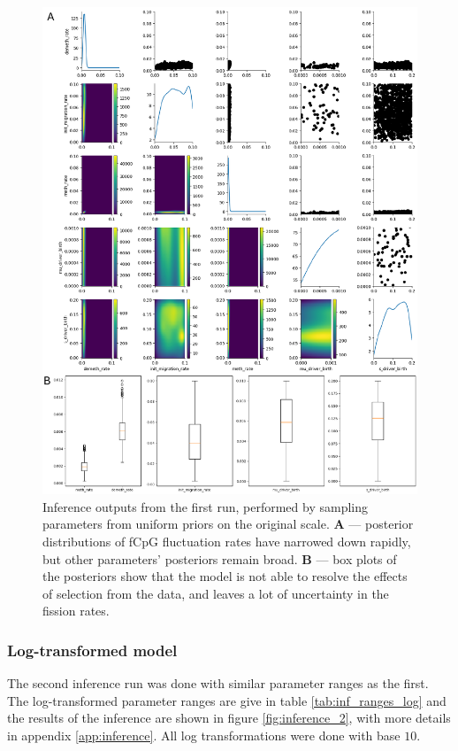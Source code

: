 \begin{figure}[h]
    \centering
    \includegraphics[width=\textwidth]{Chapter_5/figures/inference_raw/inference_1.pdf}
    \caption{Inference outputs from the first run, performed by sampling
    parameters from uniform priors on the original scale. \textbf{A} ---
    posterior distributions of fCpG fluctuation rates have narrowed down
    rapidly, but other parameters' posteriors remain broad. \textbf{B} --- box
    plots of the posteriors show that the model is not able to resolve the
    effects of selection from the data, and leaves a lot of uncertainty in the
    fission rates.}
    \label{fig:inference_1}
\end{figure}
\clearpage

\subsubsection{Log-transformed model}
The second inference run was done with similar parameter ranges as the first.
The log-transformed parameter ranges are give in table \ref{tab:inf_ranges_log}
and the results of the inference are shown in figure \ref{fig:inference_2}, with
more details in appendix \ref{app:inference}. All log transformations were
done with base $10$.

